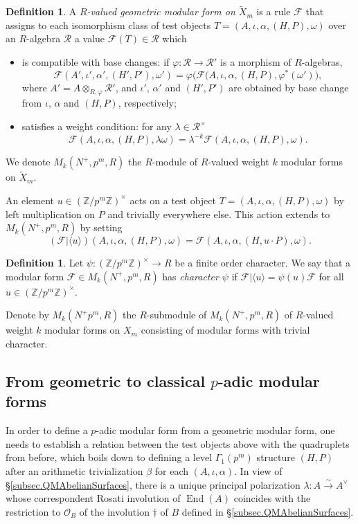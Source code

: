 \documentclass[a4paper]{amsart}
\numberwithin{equation}{section}
\theoremstyle{definition}
\newtheorem{definition}[theorem]{Definition}
\newcommand{\Z}{\mathbb{Z}}
\DeclareMathOperator{\End}{End}
\begin{document}
\begin{definition}
A \emph{$R$-valued geometric modular form on $\widetilde{X}_m$} is a rule $\mathcal{F}$ that assigns to each isomorphism class of test objects $T=(A,\iota, \alpha,(H,P),\omega)$ over an $R$-algebra $\mathcal{R}$ a value $\mathcal{F}(T)\in\mathcal{R}$ which 
\begin{itemize} 
\item is compatible with base changes: if $\varphi\colon\mathcal{R}\rightarrow\mathcal{R}'$ is a morphism of $R$-algebras, \[\mathcal{F}(A' ,\iota',\alpha',(H',P'),\omega') = 
\varphi\big(\mathcal{F}(A,\iota, \alpha,(H,P),\varphi^*(\omega')\big),\] where
$A'=A \otimes_{R,\varphi} \mathcal{R}'$, and $\iota'$, $\alpha'$ and $(H',P')$ are obtained by base change from $\iota$, $\alpha$ and $(H,P)$, respectively;

\item satisfies a weight condition: for any $\lambda\in \mathcal{R}^\times$ \[\mathcal{F}(A,\iota,\alpha,(H,P),\lambda\omega) =
\lambda^{-k}\mathcal{F}(A,\iota, \alpha,(H,P),\omega).\]
\end{itemize}
We denote $M_k(N^+,p^m,R)$ the $R$-module of $R$-valued weight $k$ modular forms on $\widetilde{X}_m$.
\end{definition}

An element $u\in(\Z/p^m\Z)^\times$ acts on a test object $T=(A,\iota, \alpha,(H,P),\omega)$ by left multiplication on $P$ and trivially everywhere else. This action extends to $M_k(N^+,p^m,R)$ by setting \[(\mathcal{F}|\langle u\rangle)(A,\iota, \alpha,(H,P),\omega)=\mathcal{F}(A,\iota, \alpha,(H,u\cdot P),\omega).\]

\begin{definition}
Let $\psi\colon(\Z/p^m\Z)^\times\rightarrow R$ be a finite order character. We say that a modular form 
$\mathcal{F}\in M_k(N^+,p^m,R)$ has \emph{character $\psi$} if $\mathcal{F}|\langle u\rangle=\psi(u)\mathcal{F}$ for all 
$u\in (\Z/p^m\Z)^\times$. 
\end{definition}

Denote by $M_k(N^+p^m,R)$ the $R$-submodule of $M_k(N^+,p^m,R)$ of $R$-valued weight $k$ modular forms on $X_m$ consisting of modular forms with trivial character.

\subsection{From geometric to classical $p$-adic modular forms}\label{subsec.Cartier}
In order to define a $p$-adic modular form from a geometric modular form, one needs to establish a relation between the test objects above with the quadruplets from before, which boils down to defining a level $\Gamma_1(p^m)$ structure $(H,P)$ after an arithmetic trivialization $\beta$ for each $(A,\iota,\alpha)$. In view of \S\ref{subsec.QMAbelianSurfaces}, there is a unique principal polarization $\lambda\colon A\stackrel{\sim}{\to}A^\vee$ whose correspondent Rosati involution of $\End(A)$ coincides with the restriction to $\mathcal{O}_B$ of the involution $\dagger$ of $B$ defined in \S\ref{subsec.QMAbelianSurfaces}.
\end{document}
